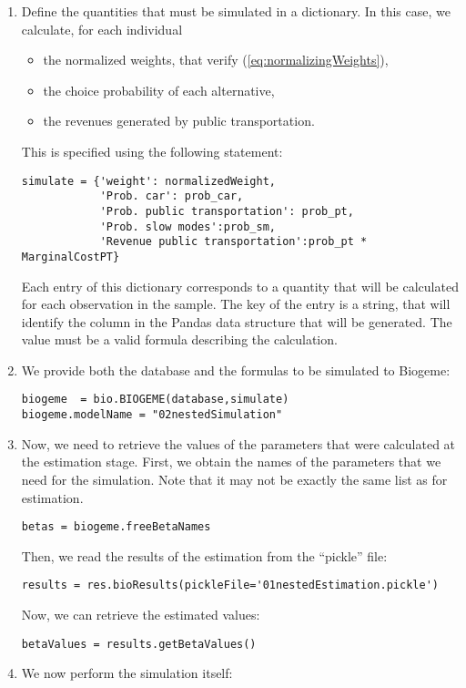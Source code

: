 \documentclass[12pt,a4paper]{article}
\newcommand{\req}[1]{(\ref{#1})}
\begin{document}
\begin{enumerate}
\item Define the quantities that must be simulated in a dictionary.  In this case, we
  calculate, for each individual
  \begin{itemize}
    \item the normalized weights, that verify
      \req{eq:normalizingWeights},
    \item the choice probability of each alternative,
     \item the revenues generated by public transportation.
  \end{itemize}
This is specified using the following statement:
\begin{lstlisting}
simulate = {'weight': normalizedWeight,
            'Prob. car': prob_car,
            'Prob. public transportation': prob_pt,
            'Prob. slow modes':prob_sm,
            'Revenue public transportation':prob_pt * MarginalCostPT}
\end{lstlisting}
Each entry of this dictionary corresponds to a quantity that will be
calculated for each observation in the sample. The key of the entry is a string, that will identify the
column in the Pandas data structure that will be generated. The value must be a valid formula describing the
calculation.
\item We provide both the database and the formulas to be simulated to
  Biogeme:
 \begin{lstlisting}
biogeme  = bio.BIOGEME(database,simulate)
biogeme.modelName = "02nestedSimulation"
  \end{lstlisting}
\item Now, we need to retrieve the values of the parameters that were
  calculated at the estimation stage.
 First, we obtain  the names  of the parameters that we need for the
  simulation. Note that it may not be exactly the same list as for
  estimation.
  \begin{lstlisting}
betas = biogeme.freeBetaNames
  \end{lstlisting}
Then, we read the results
  of the estimation from the ``pickle'' file:
  \begin{lstlisting}
results = res.bioResults(pickleFile='01nestedEstimation.pickle')
  \end{lstlisting}
   Now, we can retrieve the estimated values:
\begin{lstlisting}
betaValues = results.getBetaValues()
\end{lstlisting}
\item We now perform the simulation itself:
\begin{lstlisting}

\end{lstlisting}
\end{enumerate}
\end{document}
